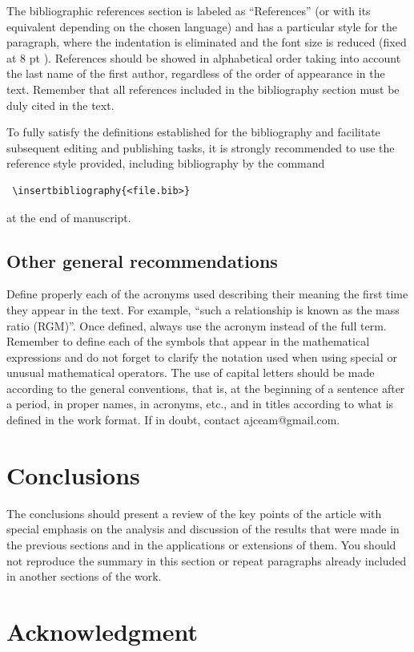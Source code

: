 \documentclass[eng]{ajceam-class}
\begin{document}
The bibliographic references section is labeled as ``References'' (or with its equivalent depending on the chosen language) and has a particular style for the paragraph, where the indentation is eliminated and the font size is reduced (fixed at 8 pt ). References should be showed in alphabetical order taking into account the last name of the first author, regardless of the order of appearance in the text. Remember that all references included in the bibliography section must be duly cited in the text.

To fully satisfy the definitions established for the bibliography and facilitate subsequent editing and publishing tasks, it is strongly recommended to use the reference style provided, including bibliography by the command
\begin{verbatim}
 \insertbibliography{<file.bib>} 
\end{verbatim}
at the end of manuscript.

\subsection{Other general recommendations}

Define properly each of the acronyms used describing their meaning the first time they appear in the text. For example, ``such a relationship is known as the mass ratio (RGM)''. Once defined, always use the acronym instead of the full term. Remember to define each of the symbols that appear in the mathematical expressions and do not forget to clarify the notation used when using special or unusual mathematical operators. The use of capital letters should be made according to the general conventions, that is, at the beginning of a sentence after a period, in proper names, in acronyms, etc., and in titles according to what is defined in the work format. If in doubt, contact ajceam@gmail.com.


\section{Conclusions}

The conclusions should present a review of the key points of the article with special emphasis on the analysis and discussion of the results that were made in the previous sections and in the applications or extensions of them. You should not reproduce the summary in this section or repeat paragraphs already included in another sections of the work.

\section{Acknowledgment}
\end{document}
